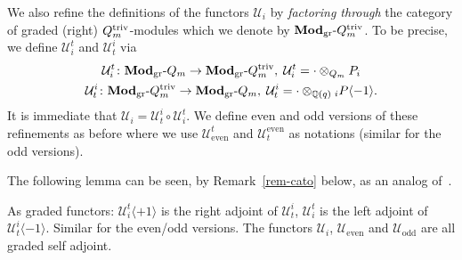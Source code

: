 We also refine 
the definitions of the functors $\mathcal U_i$ 
by \textit{factoring through} the category of 
graded (right) $Q_m^{\mathrm{triv}}$-modules which we denote by 
$\boldsymbol{\mathrm{Mod}}_{\mathrm{gr}}\text{-}Q_m^{\mathrm{triv}}$. To be precise, we define $\mathcal U_i^t$ and $\mathcal U^i_t$ via
\begin{gather*}
\mathcal U_i^t\colon\boldsymbol{\mathrm{Mod}}_{\mathrm{gr}}\text{-}Q_m\to\boldsymbol{\mathrm{Mod}}_{\mathrm{gr}}\text{-}Q_m^{\mathrm{triv}},\; \mathcal U_i^t=\cdot\otimes_{Q_{m}}P_i
\\
\mathcal U^i_t\colon\boldsymbol{\mathrm{Mod}}_{\mathrm{gr}}\text{-}Q_m^{\mathrm{triv}}\to\boldsymbol{\mathrm{Mod}}_{\mathrm{gr}}\text{-}Q_m,\; \mathcal U^i_t=\cdot\otimes_{\mathbb{Q}(q)}{}_iP\langle -1\rangle.
\end{gather*}
It is immediate that $\mathcal U_i=\mathcal U^i_t\circ\mathcal U^t_i$. 
We define even and odd versions of these refinements 
as before where we use $\mathcal U^t_{\mathrm{even}}$ 
and $\mathcal U_t^{\mathrm{even}}$ as notations (similar for the odd versions).



The following lemma can be seen, by Remark~\ref{rem-cato} below, 
as an analog of~\cite[Theorem~8.4]{st2}.



\begin{lem}\label{lem-adjoint}
As graded functors: $\mathcal U^t_i\langle+1\rangle$ is 
the right adjoint of $\mathcal U_t^i$, $\mathcal U^t_i$ 
is the left adjoint of $\mathcal U_t^i\langle-1\rangle$. 
Similar for the even/odd versions. The functors $\mathcal U_i$, $\mathcal U_{\mathrm{even}}$ 
and $\mathcal U_{\mathrm{odd}}$ are all graded self adjoint.\makeqed
\end{lem}




